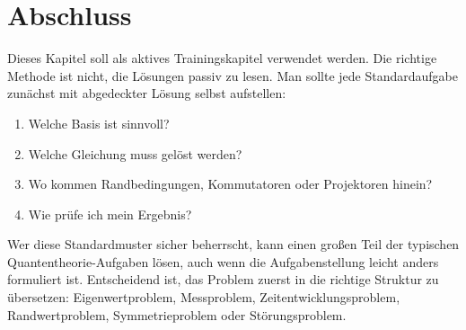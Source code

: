 \section{Abschluss}

Dieses Kapitel soll als aktives Trainingskapitel verwendet werden. Die richtige Methode ist nicht, die Lösungen passiv zu lesen. Man sollte jede Standardaufgabe zunächst mit abgedeckter Lösung selbst aufstellen:
\begin{enumerate}
    \item Welche Basis ist sinnvoll?
    \item Welche Gleichung muss gelöst werden?
    \item Wo kommen Randbedingungen, Kommutatoren oder Projektoren hinein?
    \item Wie prüfe ich mein Ergebnis?
\end{enumerate}

\begin{answerbox}
Wer diese Standardmuster sicher beherrscht, kann einen großen Teil der typischen Quantentheorie-Aufgaben lösen, auch wenn die Aufgabenstellung leicht anders formuliert ist. Entscheidend ist, das Problem zuerst in die richtige Struktur zu übersetzen: Eigenwertproblem, Messproblem, Zeitentwicklungsproblem, Randwertproblem, Symmetrieproblem oder Störungsproblem.
\end{answerbox}
